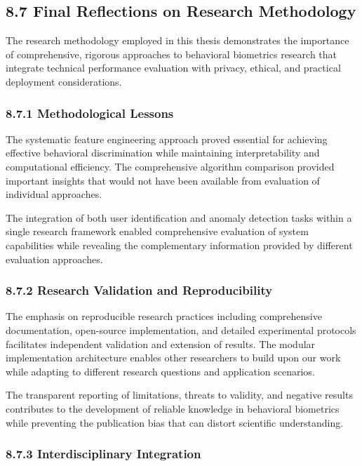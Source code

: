 \documentclass[
  11pt,
  a4paper,
]{article}
\begin{document}
\subsection{8.7 Final Reflections on Research
Methodology}\label{final-reflections-on-research-methodology}

The research methodology employed in this thesis demonstrates the
importance of comprehensive, rigorous approaches to behavioral
biometrics research that integrate technical performance evaluation with
privacy, ethical, and practical deployment considerations.

\subsubsection{8.7.1 Methodological
Lessons}\label{methodological-lessons}

The systematic feature engineering approach proved essential for
achieving effective behavioral discrimination while maintaining
interpretability and computational efficiency. The comprehensive
algorithm comparison provided important insights that would not have
been available from evaluation of individual approaches.

The integration of both user identification and anomaly detection tasks
within a single research framework enabled comprehensive evaluation of
system capabilities while revealing the complementary information
provided by different evaluation approaches.

\subsubsection{8.7.2 Research Validation and
Reproducibility}\label{research-validation-and-reproducibility}

The emphasis on reproducible research practices including comprehensive
documentation, open-source implementation, and detailed experimental
protocols facilitates independent validation and extension of results.
The modular implementation architecture enables other researchers to
build upon our work while adapting to different research questions and
application scenarios.

The transparent reporting of limitations, threats to validity, and
negative results contributes to the development of reliable knowledge in
behavioral biometrics while preventing the publication bias that can
distort scientific understanding.

\subsubsection{8.7.3 Interdisciplinary
Integration}\label{interdisciplinary-integration}
\end{document}
